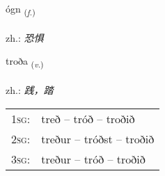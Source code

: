 \documentclass[frontgrid, backgrid]{flacards}\usepackage[]{graphicx}\usepackage[]{xcolor}
\begin{document}
\renewcommand{\flhead}{\vskip5pt \fboxsep=0pt {\small\bfseries\footnotesize Nafnorð | 名词}}
\renewcommand{\fcfoot}{\vskip5pt \fboxsep=0pt \hspace{2pt}{\small\bfseries\footnotesize 3K}}

\renewcommand{\blhead}{\vskip5pt {\small\bfseries\footnotesize Nafnorð | 名词 }}
\renewcommand{\bcfoot}{\vskip5pt \hspace{2pt}{\small\bfseries\footnotesize 3K}}


{ógn \small{\textsubscript{(\textit{f.})}} \\[1ex] %
\textphonetic{[oukn̥]} \\
zh.: \emph{恐惧} \\  [2ex]
\renewcommand*{\arraystretch}{0.8}
}

\renewcommand{\flhead}{\vskip5pt \fboxsep=0pt {\small\bfseries\footnotesize Sagnorð | 动词}}
\renewcommand{\fcfoot}{\vskip5pt \fboxsep=0pt \hspace{2pt}{\small\bfseries\footnotesize 3K}}

\renewcommand{\blhead}{\vskip5pt {\small\bfseries\footnotesize Sagnorð | 动词 }}
\renewcommand{\bcfoot}{\vskip5pt \hspace{2pt}{\small\bfseries\footnotesize 3K}}


{troða \small{\textsubscript{(\textit{v.})}} \\[1ex] %
\textphonetic{[tʰrɔːða]} \\
zh.: \emph{践，踏} \\  [2ex]
\renewcommand*{\arraystretch}{0.8}
\begin{tabular}{p{1cm}l}
\textsc{1sg}: & treð -- tróð -- troðið \\ 
\textsc{2sg}: & treður -- tróðst -- troðið \\ 
\textsc{3sg}: & treður -- tróð -- troðið \\ 
\end{tabular}
}
\end{document}
